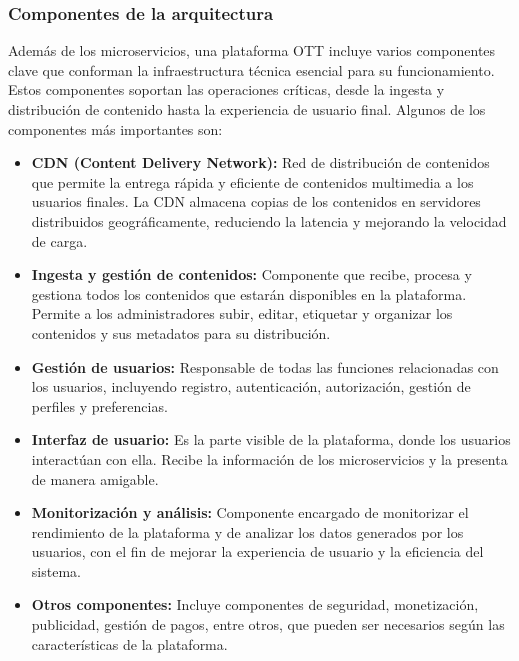 \subsubsection{Componentes de la arquitectura}
\label{subsec:fundamentos_teoricos_arquitectura_componentes}

Además de los microservicios, una plataforma OTT incluye varios componentes clave que conforman la infraestructura 
técnica esencial para su funcionamiento. Estos componentes soportan las operaciones críticas, desde la ingesta y 
distribución de contenido hasta la experiencia de usuario final. Algunos de los componentes más importantes son:

\begin{itemize}
\item \textbf{CDN (Content Delivery Network):} Red de distribución de contenidos que permite la entrega rápida y eficiente de contenidos multimedia a los usuarios finales. La CDN almacena copias de los contenidos en servidores distribuidos geográficamente, reduciendo la latencia y mejorando la velocidad de carga.
\item \textbf{Ingesta y gestión de contenidos:} Componente que recibe, procesa y gestiona todos los contenidos que estarán disponibles en la plataforma. Permite a los administradores subir, editar, etiquetar y organizar los contenidos y sus metadatos para su distribución.
\item \textbf{Gestión de usuarios:} Responsable de todas las funciones relacionadas con los usuarios, incluyendo registro, autenticación, autorización, gestión de perfiles y preferencias.
\item \textbf{Interfaz de usuario:} Es la parte visible de la plataforma, donde los usuarios interactúan con ella. Recibe la información de los microservicios y la presenta de manera amigable.
\item \textbf{Monitorización y análisis:} Componente encargado de monitorizar el rendimiento de la plataforma y de analizar los datos generados por los usuarios, con el fin de mejorar la experiencia de usuario y la eficiencia del sistema.
\item \textbf{Otros componentes:} Incluye componentes de seguridad, monetización, publicidad, gestión de pagos, entre otros, que pueden ser necesarios según las características de la plataforma.
\end{itemize}
